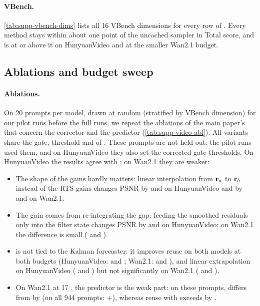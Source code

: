 

\paragraph{VBench.} \cref{tab:supp-vbench-dims} lists all 16 VBench dimensions for every row of
. Every method stays within about one point of the uncached sampler in Total score, and \ours
is at or above it on HunyuanVideo and at the smaller Wan2.1 budget.



\subsection{Ablations and budget sweep}
\label{supp:video-abl}

\paragraph{Ablations.}
On 20 prompts per model, drawn at random (stratified by VBench dimension) for our pilot runs before the full runs, we
repeat the ablations of the main paper's  that concern the corrector and the predictor
(\cref{tab:supp-video-abl}). All variants share the gate, threshold and \nfe of \ours. These prompts are not held out:
the pilot runs used them, and on HunyuanVideo they also set the corrected-gate thresholds. On HunyuanVideo the results
agree with \flux; on Wan2.1 they are weaker:
\begin{itemize}[leftmargin=*,itemsep=1pt,topsep=2pt]
  \item The shape of the gains hardly matters: linear interpolation from $\mathbf{r}_a$ to $\mathbf{r}_b$ instead of the RTS gains
  changes PSNR by \suppVidAblLinHA{} and \suppVidAblLinHB{} on HunyuanVideo and by \suppVidAblLinWA{} and
  \suppVidAblLinWB{} on Wan2.1.
  \item The gain comes from re-integrating the gap: feeding the smoothed residuals only into the filter state changes
  PSNR by \suppVidAblStateHA{} and \suppVidAblStateHB{} on HunyuanVideo; on Wan2.1 the difference is small
  (\suppVidAblStateWA{} and \suppVidAblStateWB).
  \item \pcgs is not tied to the Kalman forecaster: it improves reuse on both models at both budgets (HunyuanVideo:
  \suppVidAblGainReuseHA{} and \suppVidAblGainReuseHB; Wan2.1: \suppVidAblGainReuseWA{} and \suppVidAblGainReuseWB),
  and linear extrapolation on HunyuanVideo (\suppVidAblGainLinextHA{} and \suppVidAblGainLinextHB) but not
  significantly on Wan2.1 (\suppVidAblGainLinextWA{} and \suppVidAblGainLinextWB).
  \item On Wan2.1 at 17 \nfe, the predictor is the weak part: on these prompts, \ours differs from \seacache by
  \suppVidAblOursSeaWB{} (on all 944 prompts: $+$\suppVidGainWB), whereas reuse with \pcgs exceeds \ours by
  \suppVidAblReusePcgsWB.
\end{itemize}

